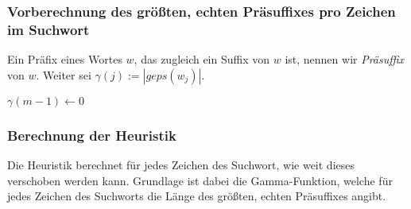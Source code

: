 \subsubsection{Vorberechnung des größten, echten Präsuffixes pro Zeichen im Suchwort}
Ein Präfix eines Wortes \(w\), das zugleich ein Suffix von \(w\) ist, nennen wir \textit{Präsuffix} von \(w\). Weiter sei \(\gamma(j) := | geps(w_j)|\).

\begin{algorithm}[H]
	\caption{$\gamma$}

	\BlankLine

	$\gamma(m-1) \longleftarrow 0$\newline
	\BlankLine

\end{algorithm}

\subsubsection{Berechnung der Heuristik}
Die Heuristik berechnet für jedes Zeichen des Suchwort, wie weit dieses verschoben werden kann. Grundlage ist dabei die Gamma-Funktion, welche für jedes Zeichen des Suchworts die Länge des größten, echten Präsuffixes angibt.

\begin{algorithm}[H]
	\caption{$\gamma$}

	\BlankLine

	\BlankLine

\end{algorithm}
